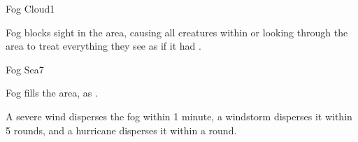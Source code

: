 \begin{spellsection}{Fog Cloud}{1}
    \begin{spellheader}
    \end{spellheader}
    \begin{spellcontent}
        \begin{spelltargetinginfo}
        \end{spelltargetinginfo}
        \begin{spelleffects}
            \spelleffect Fog blocks sight in the area, causing all creatures within or looking through the area to treat everything they see as if it had \concealment.
            \spelldur \durshort
        \end{spelleffects}
    \end{spellcontent}
    \begin{spellfooter}
        \spellnotes \fogspellnotes \fogwindspellnotes

        \physicalspellnotes
        \miscastyou
    \end{spellfooter}
\end{spellsection}

\begin{spellsection}{Fog Sea}{7}
    \begin{spellheader}
    \end{spellheader}
    \begin{spellcontent}
        \begin{spelltargetinginfo}
        \end{spelltargetinginfo}
        \begin{spelleffects}
            \spelleffect Fog fills the area, as .
        \end{spelleffects}
    \end{spellcontent}
    \begin{spellfooter}
        \spellnotes \fogspellnotes A severe wind disperses the fog within 1 minute, a windstorm disperses it within 5 rounds, and a hurricane disperses it within a round.

        \physicalspellnotes
        \miscastexplode
    \end{spellfooter}
\end{spellsection}

